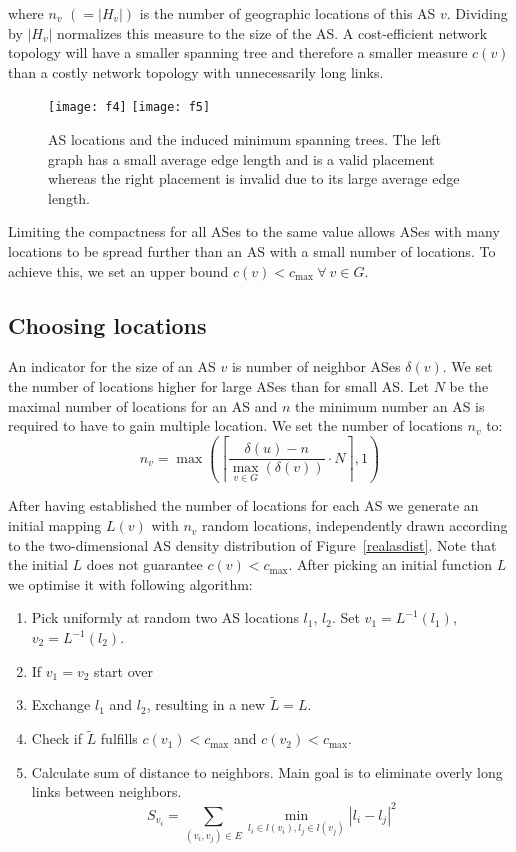 \documentclass{sig-alternate-10pt}
\begin{document}
\begin{enumerate}
\noindent where $n_v$ $(=|H_v|)$ is the number of geographic locations of this AS $v$. Dividing by $|H_v|$ normalizes this measure to the size of the AS. 
 A cost-efficient network topology will have a smaller spanning tree and therefore a smaller measure $c(v)$ than a costly network topology with unnecessarily  long links. 

\begin{figure}
\texttt{[image: f4]}
\hfil
\texttt{[image: f5]}

\caption{AS locations and the induced minimum spanning trees. The left graph has a small average edge length and is a valid placement whereas the right placement is invalid due to its large average edge length. }
\label{figmst}
\end{figure}

Limiting the compactness for all ASes to the same value allows ASes with many locations to be spread further than an AS with a small number of locations. To achieve this, we set an upper bound $c(v) < c_{\max} \ \forall \ v \in G$.

\subsection{Choosing locations}
\label{sec:choos-numb-neighb}

An indicator for the size of an AS $v$ is number of neighbor ASes $\delta(v)$. We set the number of locations higher for large ASes  than for small AS. Let $N$ be the maximal number of locations for an AS and $n$ the minimum number an AS is required to have to gain multiple location. We set the number of locations $n_v$ to:
\[ n_{v} = \max\left(\left\lceil\frac{\delta(u)-n } {\max_{v \in G}(\delta(v))} \cdot N \right\rceil,1\right) \]

After having established the number of locations for each AS
 we generate an initial mapping $L(v)$ with $n_{v}$ random locations, independently drawn according to the two-dimensional  AS density distribution of Figure~\ref{realasdist}. 
Note that the initial $L$ does not guarantee $c(v) < c_{\max}$.  After picking an initial function $L$ we optimise it with following algorithm:
\begin{enumerate}
\item \label{algstep1} Pick uniformly at random two AS locations $l_1$, $l_2$. Set $v_1=L^{-1}(l_1)$, $v_2=L^{-1}(l_2)$. 
\item If $v_1=v_2$ start over
\item Exchange $l_1$ and $l_2$, resulting in a new  $\tilde L=L$. \item Check if $\tilde L$ fulfills $c(v_1) < c_{\max}$ and $c(v_2) < c_{\max}$.
\item Calculate sum of distance to neighbors. Main goal is to eliminate overly long links between neighbors. 
\[ S_{v_i} = \sum_{(v_i,v_j) \in E} \min_{l_i \in l(v_i),l_j \in l(v_j)}\left|l_i - l_j\right|^2  \]


\end{enumerate}
\end{enumerate}
\end{document}
